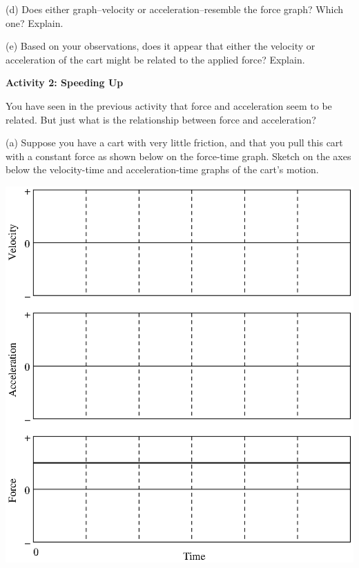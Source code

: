 (d) Does either graph--velocity or acceleration--resemble the force graph? Which
one? Explain.
\vspace{20mm}

(e) Based on your observations, does it appear that either the velocity or acceleration
of the cart might be related to the applied force? Explain.
\vspace{20mm}

\newpage

\textbf{Activity 2: Speeding Up }

You have seen in the previous activity that force and acceleration seem to be
related. But just what is the relationship between force and acceleration? 

(a) Suppose you have a cart with very little friction, and that you pull this
cart with a constant force as shown below on the force-time graph. Sketch on
the axes below the velocity-time and acceleration-time graphs of the cart's
motion.

\vspace{0.3cm}
{\par\centering \includegraphics{force1_fig3.eps} \par}
\vspace{0.3cm}

